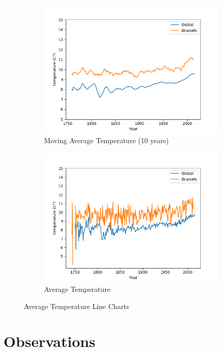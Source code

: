 \documentclass{article}
\begin{document}
\begin{figure}[H]
\centering
\begin{subfigure}[h]{1.0\linewidth}
\includegraphics[width=\linewidth]{MovingAverageTemperature.png}
\caption{Moving Average Temperature (10 years)}
\end{subfigure}
\begin{subfigure}[h]{1.0\linewidth}
\includegraphics[width=\linewidth]{AverageTemperature.png}
\caption{Average Temperature}
\end{subfigure}
\caption{Average Temperature Line Charts}
\label{fig:Average Temperature Line Chart}
\end{figure}

\section{Observations}
\end{document}
